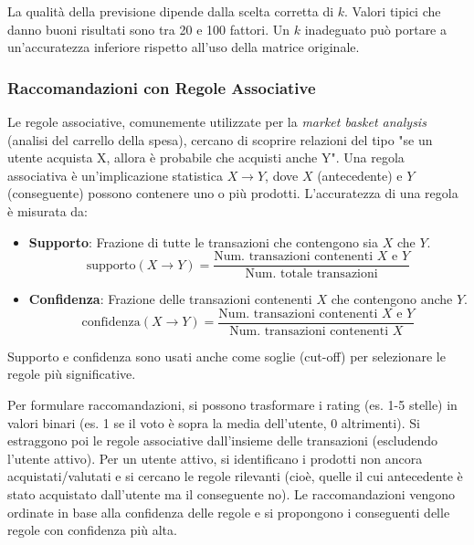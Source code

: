 \documentclass{article}
\begin{document}
La qualità della previsione dipende dalla scelta corretta di $k$. Valori tipici che danno buoni risultati sono tra 20 e 100 fattori. Un $k$ inadeguato può portare a un'accuratezza inferiore rispetto all'uso della matrice originale.

\subsubsection{Raccomandazioni con Regole Associative}
Le regole associative, comunemente utilizzate per la \textit{market basket analysis} (analisi del carrello della spesa), cercano di scoprire relazioni del tipo "se un utente acquista X, allora è probabile che acquisti anche Y".
Una regola associativa è un'implicazione statistica $X \rightarrow Y$, dove $X$ (antecedente) e $Y$ (conseguente) possono contenere uno o più prodotti.
L'accuratezza di una regola è misurata da:
\begin{itemize}
    \item \textbf{Supporto}: Frazione di tutte le transazioni che contengono sia $X$ che $Y$.
          $$ \text{supporto}(X \rightarrow Y) = \frac{\text{Num. transazioni contenenti } X \text{ e } Y}{\text{Num. totale transazioni}} $$
    \item \textbf{Confidenza}: Frazione delle transazioni contenenti $X$ che contengono anche $Y$.
          $$ \text{confidenza}(X \rightarrow Y) = \frac{\text{Num. transazioni contenenti } X \text{ e } Y}{\text{Num. transazioni contenenti } X} $$
\end{itemize}
Supporto e confidenza sono usati anche come soglie (cut-off) per selezionare le regole più significative.

Per formulare raccomandazioni, si possono trasformare i rating (es. 1-5 stelle) in valori binari (es. 1 se il voto è sopra la media dell'utente, 0 altrimenti). Si estraggono poi le regole associative dall'insieme delle transazioni (escludendo l'utente attivo). Per un utente attivo, si identificano i prodotti non ancora acquistati/valutati e si cercano le regole rilevanti (cioè, quelle il cui antecedente è stato acquistato dall'utente ma il conseguente no). Le raccomandazioni vengono ordinate in base alla confidenza delle regole e si propongono i conseguenti delle regole con confidenza più alta.
\end{document}

